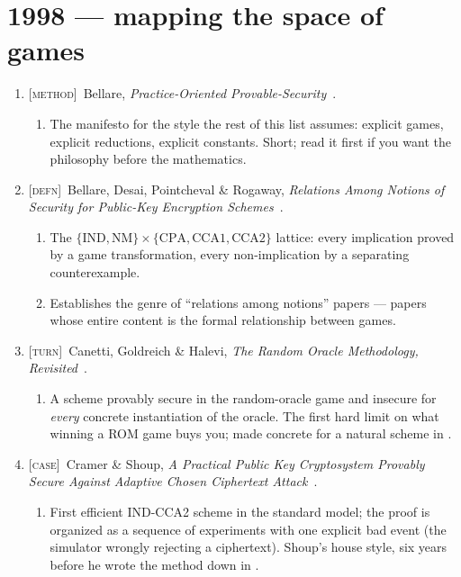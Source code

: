 \documentclass[11pt]{article}
\newcommand{\kind}[1]{{\footnotesize\textsc{\textcolor{yearcolor}{[#1]}}}\ }
\newcommand{\defn}{\kind{defn}}
\newcommand{\method}{\kind{method}}
\newcommand{\turn}{\kind{turn}}
\newcommand{\case}{\kind{case}}
\newcommand{\paper}[3]{#1, \emph{#2}~\cite{#3}.}
\begin{document}
\section{1998 --- mapping the space of games}

\begin{enumerate}
  \item \method \paper{Bellare}{Practice-Oriented Provable-Security}{Bell98}
    \begin{enumerate}
      \item The manifesto for the style the rest of this list assumes: explicit
        games, explicit reductions, explicit constants. Short; read it first if
        you want the philosophy before the mathematics.
    \end{enumerate}

  \item \defn \paper{Bellare, Desai, Pointcheval \& Rogaway}{Relations Among
    Notions of Security for Public-Key Encryption Schemes}{BDPR98}
    \begin{enumerate}
      \item The $\{\mathrm{IND}, \mathrm{NM}\} \times
        \{\mathrm{CPA}, \mathrm{CCA1}, \mathrm{CCA2}\}$ lattice: every
        implication proved by a game transformation, every non-implication by a
        separating counterexample.
      \item Establishes the genre of ``relations among notions'' papers ---
        papers whose entire content is the formal relationship between games.
    \end{enumerate}

  \item \turn \paper{Canetti, Goldreich \& Halevi}{The Random Oracle
    Methodology, Revisited}{CGH04}
    \begin{enumerate}
      \item A scheme provably secure in the random-oracle game and insecure for
        \emph{every} concrete instantiation of the oracle. The first hard limit
        on what winning a ROM game buys you; made concrete for a natural scheme
        in \cite{BBP03}.
    \end{enumerate}

  \item \case \paper{Cramer \& Shoup}{A Practical Public Key Cryptosystem
    Provably Secure Against Adaptive Chosen Ciphertext Attack}{CS98}
    \begin{enumerate}
      \item First efficient IND-CCA2 scheme in the standard model; the proof is
        organized as a sequence of experiments with one explicit bad event (the
        simulator wrongly rejecting a ciphertext). Shoup's house style, six
        years before he wrote the method down in \cite{Shou04}.
    \end{enumerate}
\end{enumerate}
\end{document}
